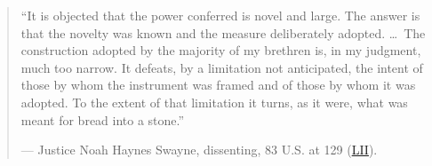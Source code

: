 \documentclass[12pt]{article}
\begin{document}
\begin{quote}
``It is objected that the power conferred is novel and large. The answer is that the novelty was known and the measure deliberately adopted. \ldots\ The construction adopted by the majority of my brethren is, in my judgment, much too narrow. It defeats, by a limitation not anticipated, the intent of those by whom the instrument was framed and of those by whom it was adopted. To the extent of that limitation it turns, as it were, what was meant for bread into a stone.''

--- Justice Noah Haynes Swayne, dissenting, 83 U.S. at 129 (\href{https://www.law.cornell.edu/supremecourt/text/83/36}{LII}).
\end{quote}
\end{document}
